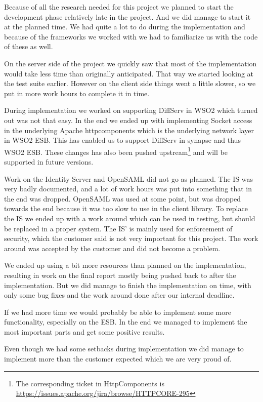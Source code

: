 
Because of all the research needed for this project we planned to start the development phase relatively late in the project. And we did manage to start it at the planned time. We had quite a lot to do during the implementation and because of the frameworks we worked with we had to familiarize us with the code of these as well. 

On the server side of the project we quickly saw that most of the implementation would take less time than originally anticipated. That way we started looking at the test suite earlier. However on the client side things went a little slower, so we put in more work hours to complete it in time. 

During implementation we worked on supporting DiffServ in WSO2 which turned out was not that easy. In the end we ended up with implementing Socket access in the underlying Apache \Gls{httpcomponents} which is the underlying network layer in WSO2 ESB. This has enabled us to support DiffServ in \Gls{synapse} and thus WSO2 ESB. These changes has also been pushed upstream\footnote{The corresponding ticket in HttpComponents is \url{https://issues.apache.org/jira/browse/HTTPCORE-295}} and will be supported in future versions.

Work on the Identity Server and OpenSAML did not go as planned. The IS was very badly documented, and a lot of work hours was put into something that in the end was dropped. OpenSAML was used at some point, but was dropped towards the end because it was too slow to use in the client library. To replace the IS we ended up with a work around which can be used in testing, but should be replaced in a proper system. The IS' is mainly used for enforcement of security, which the customer said is not very important for this project. The work around was accepted by the customer and did not become a problem.

We ended up using a bit more resources than planned on the implementation, resulting in work on the final report mostly being pushed back to after the implementation. But we did manage to finish the implementation on time, with only some bug fixes and the work around done after our internal deadline.

If we had more time we would probably be able to implement some more functionality, especially on the ESB. In the end we managed to implement the most important parts and get some positive results.

Even though we had some setbacks during implementation we did manage to implement more than the customer expected which we are very proud of.
